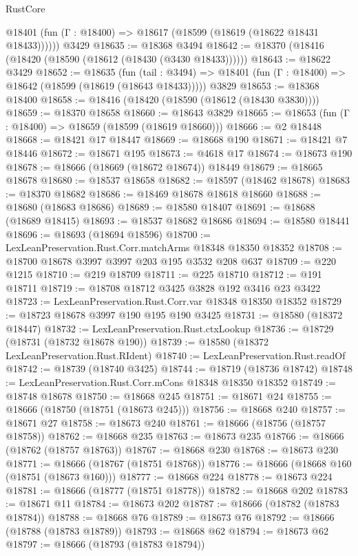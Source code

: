 \begin{lexlean}{RustCore}
\begin{coremodule}
      @18401 (fun (Γ : @18400) => @18617 (@18599 (@18619 (@18622 @18431 @18433))))))
    @3429
@18635 := @18368 @3494
@18642 := @18370 (@18416 (@18420 (@18590 (@18612 (@18430 (@3430 @18433))))))
@18643 := @18622 @3429
@18652 := @18635
    (fun (tail : @3494) => @18401 (fun (Γ : @18400) => @18642 (@18599 (@18619 (@18643 @18433)))))
    @3829
@18653 := @18368 @18400
@18658 := @18416 (@18420 (@18590 (@18612 (@18430 @3830))))
@18659 := @18370 @18658
@18660 := @18643 @3829
@18665 := @18653 (fun (Γ : @18400) => @18659 (@18599 (@18619 @18660)))
@18666 := @2 @18448
@18668 := @18421 @17 @18447
@18669 := @18668 @190
@18671 := @18421 @7 @18446
@18672 := @18671 @195
@18673 := @4618 @17
@18674 := @18673 @190
@18678 := @18666 (@18669 (@18672 @18674)) @18449
@18679 := @18665 @18678
@18680 := @18537 @18658
@18682 := @18597 (@18462 @18678)
@18683 := @18370 @18682
@18686 := @18469 @18678 @18618 @18660
@18688 := @18680 (@18683 @18686)
@18689 := @18580 @18407
@18691 := @18688 (@18689 @18415)
@18693 := @18537 @18682 @18686
@18694 := @18580 @18441
@18696 := @18693 (@18694 @18596)
@18700 := LexLeanPreservation.Rust.Corr.matchArms @18348 @18350 @18352
@18708 := @18700 @18678 @3997 @3997 @203 @195 @3532 @208 @637
@18709 := @220 @1215
@18710 := @219 @18709
@18711 := @225 @18710
@18712 := @191 @18711
@18719 := @18708 @18712 @3425 @3828 @192 @3416 @23 @3422
@18723 := LexLeanPreservation.Rust.Corr.var @18348 @18350 @18352
@18729 := @18723 @18678 @3997 @190 @195 @190 @3425
@18731 := @18580 (@18372 @18447)
@18732 := LexLeanPreservation.Rust.ctxLookup
@18736 := @18729 (@18731 (@18732 @18678 @190))
@18739 := @18580 (@18372 LexLeanPreservation.Rust.RIdent)
@18740 := LexLeanPreservation.Rust.readOf
@18742 := @18739 (@18740 @3425)
@18744 := @18719 (@18736 @18742)
@18748 := LexLeanPreservation.Rust.Corr.mCons @18348 @18350 @18352
@18749 := @18748 @18678
@18750 := @18668 @245
@18751 := @18671 @24
@18755 := @18666 (@18750 (@18751 (@18673 @245)))
@18756 := @18668 @240
@18757 := @18671 @27
@18758 := @18673 @240
@18761 := @18666 (@18756 (@18757 @18758))
@18762 := @18668 @235
@18763 := @18673 @235
@18766 := @18666 (@18762 (@18757 @18763))
@18767 := @18668 @230
@18768 := @18673 @230
@18771 := @18666 (@18767 (@18751 @18768))
@18776 := @18666 (@18668 @160 (@18751 (@18673 @160)))
@18777 := @18668 @224
@18778 := @18673 @224
@18781 := @18666 (@18777 (@18751 @18778))
@18782 := @18668 @202
@18783 := @18671 @11
@18784 := @18673 @202
@18787 := @18666 (@18782 (@18783 @18784))
@18788 := @18668 @76
@18789 := @18673 @76
@18792 := @18666 (@18788 (@18783 @18789))
@18793 := @18668 @62
@18794 := @18673 @62
@18797 := @18666 (@18793 (@18783 @18794))

\end{coremodule}
\end{lexlean}
